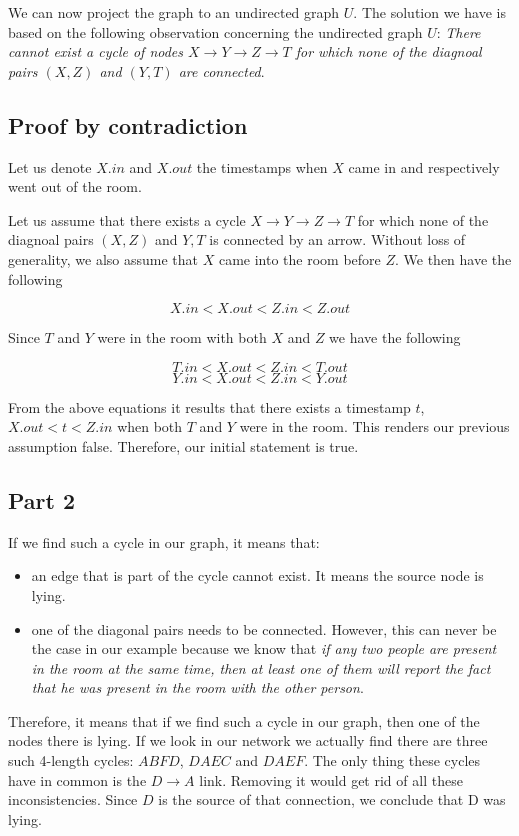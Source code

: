 \documentclass[11pt,a4paper,oneside]{report}
\begin{document}
We can now project the graph to an undirected graph $U$. The solution we 
have is based on the following observation concerning the undirected graph $U$: 
\textit{There cannot exist a cycle of nodes $X \rightarrow Y \rightarrow Z 
\rightarrow T$ for which none of the diagnoal pairs $(X,Z)$ and $(Y,T)$ are 
connected}. 

\subsection*{Proof by contradiction}
Let us denote $X.in$ and $X.out$ the timestamps when $X$ came in and 
respectively went out of the room. 

Let us assume that there exists a cycle $X \rightarrow Y \rightarrow Z 
\rightarrow T$ for which none of the diagnoal pairs $(X,Z)$ and $Y,T$ is 
connected by an arrow. Without loss of generality, we also assume that $X$ came 
into the room before $Z$. We then have the following

$$ X.in < X.out < Z.in < Z.out$$

Since $T$ and $Y$ were in the room with both $X$ and $Z$ we  have the following

$$T.in < X.out < Z.in < T.out$$
$$Y.in < X.out < Z.in < Y.out$$

From the above equations it results that there exists a timestamp $t$, $X.out < 
t < Z.in$ when both $T$ and $Y$ were in the room. This renders our previous 
assumption false. Therefore, our initial statement is true.

\subsection*{Part 2}

If we find such a cycle in our graph, it means that:
\begin{itemize}
 \item an edge that is part of the cycle cannot exist. It means the source node 
is lying. 
 \item one of the diagonal pairs needs to be connected. However, this can never 
be the case in our example because we know that \textit{if any two people are 
present in the room at the same time, then at least one of them will report the 
fact that he was present in the room with the other person}.
\end{itemize}

Therefore, it means that if we find such a cycle in our graph, then one of the 
nodes there is lying. If we look in our network we actually find there are three
such 4-length cycles: $ABFD$, $DAEC$ and $DAEF$. The only thing these cycles 
have in common is the $D \rightarrow A$ link. Removing it would get rid 
of all these inconsistencies. Since $D$ is the source of that connection, we 
conclude that D was lying. 
\end{document}
